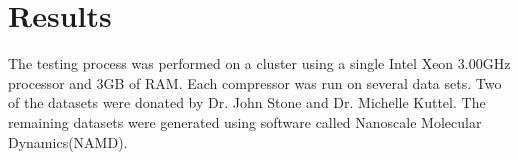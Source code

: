 \documentclass[a4paper,11pt]{report}
\begin{document}
% 
% 
% 
% 
% 

 

\chapter{Results}

The testing process was performed on a cluster using a single Intel Xeon 3.00GHz processor and 3GB of RAM. Each compressor was run on several data sets. Two of the datasets were donated by Dr. John Stone and Dr. Michelle Kuttel. The remaining datasets were generated using software called Nanoscale Molecular Dynamics(NAMD). 
\end{document}
